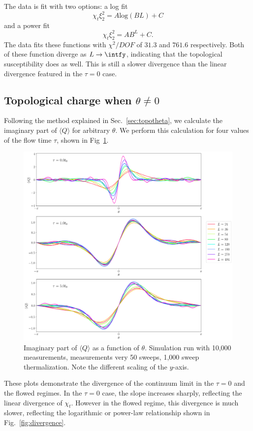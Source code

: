 \documentclass[12pt]{report}
\begin{document}
The data is fit with two options: a log fit
\begin{equation}
    \chi_t \xi_2^2 = A \mathrm{log}(B L) + C
\end{equation}
and a power fit
\begin{equation}
    \chi_t \xi_2^2 = A B^L + C.
\end{equation}
The data fits these functions with $\chi^2/DOF$ of $31.3$ and $761.6$ respectively. Both of these function diverge as $L\rightarrow \intfy$, indicating that the topological susceptibility does as well. This is still a slower divergence than the linear divergence featured in the $\tau=0$ case.

\subsection{Topological charge when $\theta\neq 0$}
Following the method explained in Sec.~\ref{sec:topotheta}, we calculate the imaginary part of $\langle Q \rangle$ for arbitrary $\theta$. We perform this calculation for four values of the flow time $\tau$, shown in Fig~\ref{fig:theta}.
\begin{figure}[h]
    \centering
      \includegraphics[width=\textwidth]{imgs/theta.png}
      \caption{\label{fig:theta} Imaginary part of $\langle Q \rangle$ as a function of $\theta$. Simulation run with 10,000 measurements, measurements very 50 sweeps, 1,000 sweep thermalization. Note the different scaling of the $y$-axis.}
\end{figure}
These plots demonstrate the divergence of the continuum limit in the $\tau=0$ and the flowed regimes. In the $\tau=0$ case, the slope increases sharply, reflecting the linear divergence of $\chi_t$. However in the flowed regime, this divergence is much slower, reflecting the logarithmic or power-law relationship shown in Fig.~\ref{fig:divergence}.
\end{document}
